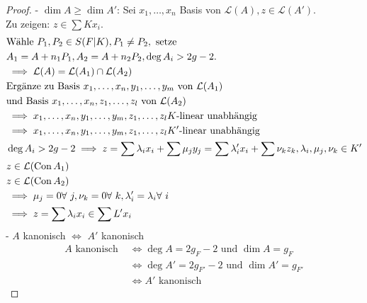\begin{proof}
    - $\dim A \geq \dim A'$:
    Sei $x_1,\ldots,x_n$ Basis von $\mathcal{L}(A), z \in \mathcal{L}(A')$.\\
    Zu zeigen: $z \in \sum Kx_i$.
    \begin{align*}
        & \text{Wähle } P_1,P_2 \in S(F|K), P_1 \ne P_2, \text{ setze } \\
        & A_1 = A + n_1 P_1, A_2 = A + n_2 P_2, \deg A_i > 2g -2.\\
        & \implies \mathcal{L}(A) = \mathcal{L}(A_1) \cap \mathcal{L}(A_2)\\
        & \text{Ergänze zu Basis } x_1,\ldots,x_n,y_1,\ldots,y_m \text{ von } \mathcal{L}(A_1)\\
        & \text{und Basis } x_1,\ldots,x_n,z_1,\ldots,z_l \text{ von } \mathcal{L}(A_2)\\
        & \implies x_1,\ldots,x_n,y_1,\ldots,y_m,z_1,\ldots,z_l K\text{-linear unabhängig}\\
        & \implies x_1,\ldots,x_n,y_1,\ldots,y_m,z_1,\ldots,z_l K'\text{-linear unabhängig}\\
        & \deg A_i > 2g -2 \implies z = \sum \lambda_ix_i + \sum \mu_jy_j = \sum \lambda'_ix_i + \sum \nu_k z_k, \lambda_i, \mu_j,\nu_k\in K'\\
        & z \in \mathcal{L}(\operatorname{Con} A_1)\\
        & z \in \mathcal{L}(\operatorname{Con} A_2)\\
        & \implies \mu_j = 0 \forall~j, \nu_k=0 \forall~k, \lambda'_i=\lambda_i \forall~i\\
        & \implies z = \sum \lambda_i x_i \in \sum L'x_i 
    \end{align*}
    - $A$ kanonisch $\iff$ $A'$ kanonisch
    \begin{align*}
        A \text{ kanonisch } & \iff \deg A = 2g_F -2 \text{ und } \dim A = g_F\\
        & \iff \deg A' = 2g_{F'}-2 \text{ und } \dim A' = g_{F'}\\
        & \iff A' \text{ kanonisch} 
    \end{align*}
\end{proof}
